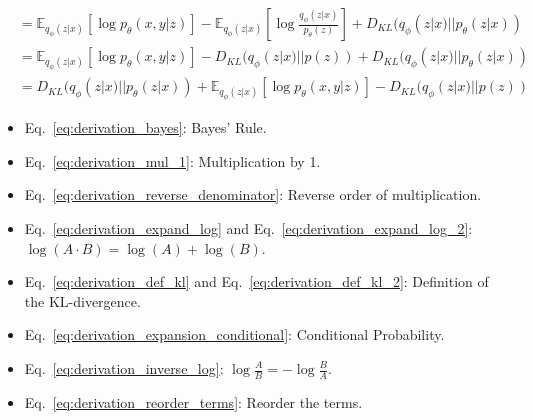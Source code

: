 \begin{align}
                        & = \mathbb{E}_{q_{\phi}(z | x)}\left[\log p_\theta(x, y | z)\right] - \mathbb{E}_{q_{\phi}(z | x)}\left[\log \frac{q_\phi(z|x)}{p_\theta(z)}\right] + D_{KL}(q_\phi(z|x) || p_\theta(z|x)) \label{eq:derivation_inverse_log}      \\
                        & = \mathbb{E}_{q_{\phi}(z | x)}\left[\log p_\theta(x, y | z)\right] - D_{KL}(q_\phi(z|x) || p(z)) + D_{KL}(q_\phi(z|x) || p_\theta(z|x))         \label{eq:derivation_def_kl_2}                                                   \\
                        & = D_{KL}(q_\phi(z|x) || p_\theta(z|x)) + \mathbb{E}_{q_{\phi}(z | x)}\left[\log p_\theta(x, y | z)\right] - D_{KL}(q_\phi(z|x) || p(z)) \label{eq:derivation_reorder_terms}
\end{align}

\begin{itemize}
    \item Eq.~\ref{eq:derivation_bayes}: Bayes' Rule.
    \item Eq.~\ref{eq:derivation_mul_1}: Multiplication by 1.
    \item Eq.~\ref{eq:derivation_reverse_denominator}: Reverse order of multiplication.
    \item Eq.~\ref{eq:derivation_expand_log} and Eq.~\ref{eq:derivation_expand_log_2}: $\log(A \cdot B) = \log(A) + \log(B)$.
    \item Eq.~\ref{eq:derivation_def_kl} and Eq.~\ref{eq:derivation_def_kl_2}: Definition of the KL-divergence.
    \item Eq.~\ref{eq:derivation_expansion_conditional}: Conditional Probability.
    \item Eq.~\ref{eq:derivation_inverse_log}: $\log \frac{A}{B} = - \log \frac{B}{A}$.
    \item Eq.~\ref{eq:derivation_reorder_terms}: Reorder the terms.
\end{itemize}

